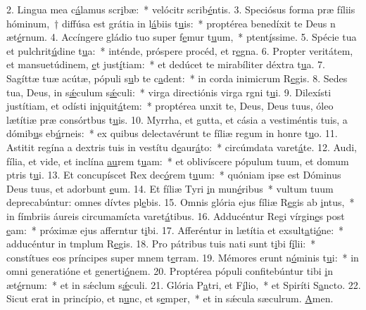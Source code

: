 2. Lingua mea c\uline{á}lamus scr\uline{i}bæ:~* velócitr scrib\uline{é}ntis.
3. Speciósus forma præ fíliis hóminum,~† diffúsa est grátia in l\uline{á}biis t\uline{u}is:~* proptérea benedíxit te Deus n æt\uline{é}rnum.
4. Accíngere gládio tuo super f\uline{e}mur t\uline{u}um,~* ptent\uline{í}ssime.
5. Spécie tua et pulchrit\uline{ú}dine t\uline{u}a:~* inténde, próspere procéd, et r\uline{e}gna.
6. Propter veritátem, et mansuetúdinem, \uline{e}t just\uline{í}tiam:~* et dedúcet te mirabíliter déxtra t\uline{u}a.
7. Sagíttæ tuæ acútæ, pópuli s\uline{u}b te c\uline{a}dent:~* in corda inimicrum R\uline{e}gis.
8. Sedes tua, Deus, in s\uline{ǽ}culum s\uline{ǽ}culi:~* virga directiónis virga rgni t\uline{u}i.
9. Dilexísti justítiam, et odísti in\uline{i}quit\uline{á}tem:~* proptérea unxit te, Deus, Deus tuus, óleo lætítiæ præ consórtbus t\uline{u}is.
10. Myrrha, et gutta, et cásia a vestiméntis tuis, a dómib\uline{u}s eb\uline{ú}rneis:~* ex quibus delectavérunt te fíliæ regum in honre t\uline{u}o.
11. Astitit regína a dextris tuis in vestítu d\uline{e}aur\uline{á}to:~* circúmdata varet\uline{á}te.
12. Audi, fília, et vide, et inclína \uline{au}rem t\uline{u}am:~* et oblivíscere pópulum tuum, et domum ptris t\uline{u}i.
13. Et concupíscet Rex dec\uline{ó}rem t\uline{u}um:~* quóniam ipse est Dóminus Deus tuus, et adorbunt \uline{e}um.
14. Et fíliæ Tyri \uline{i}n mun\uline{é}ribus~* vultum tuum deprecabúntur: omnes dívtes pl\uline{e}bis.
15. Omnis glória ejus fíliæ R\uline{e}gis ab \uline{i}ntus,~* in fímbriis áureis circumamícta varet\uline{á}tibus.
16. Adducéntur Regi vírgin\uline{e}s post \uline{e}am:~* próximæ ejus afferntur t\uline{i}bi.
17. Afferéntur in lætítia et exsult\uline{a}ti\uline{ó}ne:~* adducéntur in tmplum R\uline{e}gis.
18. Pro pátribus tuis nati sunt t\uline{i}bi f\uline{í}lii:~* constítues eos príncipes super mnem t\uline{e}rram.
19. Mémores erunt n\uline{ó}minis t\uline{u}i:~* in omni generatióne et generti\uline{ó}nem.
20. Proptérea pópuli confitebúntur tibi \uline{i}n æt\uline{é}rnum:~* et in sǽclum s\uline{ǽ}culi.
21. Glória P\uline{a}tri, et F\uline{í}lio,~* et Spiríti S\uline{a}ncto.
22. Sicut erat in princípio, et n\uline{u}nc, et s\uline{e}mper,~* et in sǽcula sæculrum. \uline{A}men.

